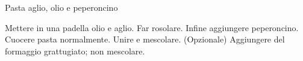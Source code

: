 \begin{recipe}{Pasta aglio, olio e peperoncino}
    \begin{header}
    
    \end{header}
    
    \begin{ingredients}[5]
    \end{ingredients}
    
    \begin{preparation}
        \step Mettere in una padella olio e aglio.
        \step Far rosolare. Infine aggiungere peperoncino.
        \step Cuocere pasta normalmente.
        \step Unire e mescolare.
        \step (Opzionale) Aggiungere del formaggio grattugiato; non mescolare.
    \end{preparation}
\end{recipe}
